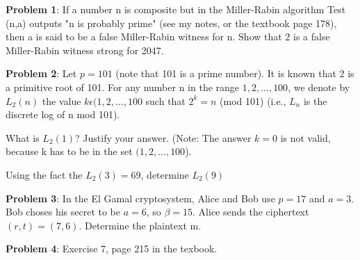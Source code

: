 \documentclass[12pt,letterpaper,final]{report}
\begin{document}

\vline


\noindent\textbf{Problem 1}: If a number n is composite but in the Miller-Rabin algorithm Test (n,a) outputs "n is probably prime" (see my notes, or the textbook page 178), then a is said to be a false Miller-Rabin witness for n. Show that 2 is a false Miller-Rabin witness strong for 2047.

\bigskip
\noindent\textbf{Problem 2}:  Let $p = 101$ (note that 101 is a prime number). It is known that 2 is a primitive root of 101. For any number n in the range ${1,2, ... , 100}$, we denote by $L_{2}(n)$ the value $k \epsilon {(1,2, ... , 100}$ such that $2^{k} = n$ (mod 101) (i.e., $L_{n}$ is the discrete log of n mod 101).
\begin{alphalist}
	\item\indent What is $L_{2}(1)$? Justify your answer. (Note: The answer $k = 0$ is not valid, because k has to be in the set ${(1,2, ... , 100}$).
	\item\indent Using the fact the $L_{2}(3) = 69$, determine $L_{2}(9)$
\end{alphalist}


\bigskip
\noindent\textbf{Problem 3}: In the El Gamal cryptosystem, Alice and Bob use $p = 17$ and $a = 3$. Bob choses his secret to be $a = 6$, so $\beta = 15$. Alice sends the ciphertext $(r,t) = (7,6)$. Determine the plaintext m.


\bigskip
\noindent\textbf{Problem 4}: Exercise 7, page 215 in the texbook.
\end{document}
